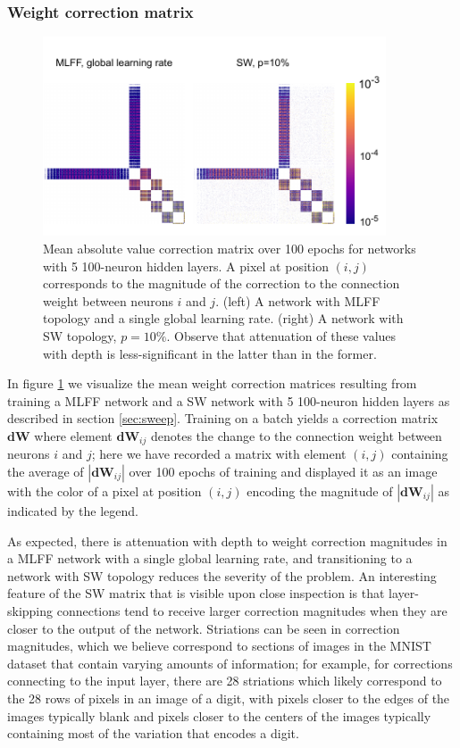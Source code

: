\documentclass[utf8]{frontiersSCNS}
\begin{document}
\subsubsection{Weight correction matrix}
\begin{figure}
	\centering
	\includegraphics[width=4in]{figures/matrix_image.pdf}
	\caption{Mean absolute value correction matrix over 100 epochs for networks with 5 100-neuron hidden layers. A pixel at position $(i, j)$ corresponds to the magnitude of the correction to the connection weight between neurons $i$ and $j$. (left) A network with MLFF topology and a single global learning rate. (right) A network with SW topology, $p=10\%$. Observe that attenuation of these values with depth is less-significant in the latter than in the former.}
	\label{fig:matrices}
\end{figure}

In figure \ref{fig:matrices} we visualize the mean weight correction matrices resulting from training a MLFF network and a SW network with 5 100-neuron hidden layers as described in section \ref{sec:sweep}. Training on a batch yields a correction matrix $\mathbf{dW}$ where element $\mathbf{dW}_{ij}$ denotes the change to the connection weight between neurons $i$ and $j$; here we have recorded a matrix with element $(i, j)$ containing the average of $|\mathbf{dW}_{ij}|$ over 100 epochs of training and displayed it as an image with the color of a pixel at position $(i, j)$ encoding the magnitude of $|\mathbf{dW}_{ij}|$ as indicated by the legend.

As expected, there is attenuation with depth to weight correction magnitudes in a MLFF network with a single global learning rate, and transitioning to a network with SW topology reduces the severity of the problem. An interesting feature of the SW matrix that is visible upon close inspection is that layer-skipping connections tend to receive larger correction magnitudes when they are closer to the output of the network. Striations can be seen in correction magnitudes, which we believe correspond to sections of images in the MNIST dataset that contain varying amounts of information; for example, for corrections connecting to the input layer, there are 28 striations which likely correspond to the 28 rows of pixels in an image of a digit, with pixels closer to the edges of the images typically blank and pixels closer to the centers of the images typically containing most of the variation that encodes a digit.
\end{document}
